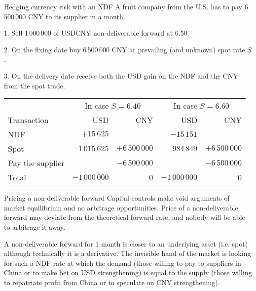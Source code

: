 \documentclass{beamer}
\begin{document}
\begin{frame}{Hedging currency risk with an NDF}
\justify
A fruit company from the U.S. has to pay 6\,500\,000 CNY to its supplier in a month.

1. Sell 1\,000\,000 of USDCNY non-deliverable forward at 6.50.

2. On the fixing date buy 6\,500\,000 CNY at prevailing (and unknown) spot rate  $S$.

3. On the delivery date receive both the USD gain on the NDF and the CNY from the spot trade.

\justify
\centering
\small
\begin{tabular}{l|r|r|r|r}
& \multicolumn{2}{c|}{In case $S=6.40$} & \multicolumn{2}{c}{In case $S=6.60$} \\ \cline{2-5}
Transaction & USD & CNY & USD & CNY \\ \hline
NDF & $+15\,625$ & & $-15\,151$ & \\
Spot & $-1\,015\,625$ & $+6\,500\,000$ & $-984\,849$ & $+6\,500\,000$ \\
Pay the supplier & & $-6\,500\,000$ & & $-6\,500\,000$ \\ \hline
Total & $-1\,000\,000$ & 0 & $-1\,000\,000$ & 0
\end{tabular}
\end{frame}



\begin{frame}{Pricing a non-deliverable forward}
\justify
Capital controls make void arguments of market equilibrium and no arbitrage opportunities. Price of a non-deliverable forward may deviate from the theoretical forward rate, and nobody will be able to arbitrage it away.

\justify
A non-deliverable forward for 1 month is closer to an underlying asset (i.e. spot) although technically it is a derivative. The invisible hand of the market is looking for such a NDF rate at which the demand (those willing to pay to suppliers in China or to make bet on USD strengthening) is equal to the supply (those willing to repatriate profit from China or to speculate on CNY strengthening).
\end{frame}
\end{document}
